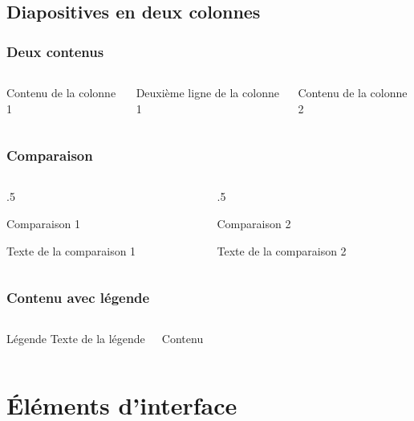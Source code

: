 \documentclass[aspectratio=1610,compress,t,english,french]{beamer}
\newenvironment{HECcomparaison}[1]{%
	\begin{column}[t]{.5\textwidth}
		\vspace{-7mm}		
		\begin{block}{#1}
}{%
		\end{block}
	\end{column}
}
\begin{document}
\subsection{Diapositives en deux colonnes}

\begin{frame}
	\frametitle{Deux contenus}
	\begin{columns}
			Contenu de la colonne 1
			
			Deuxième ligne de la colonne 1
			
			Contenu de la colonne 2
	\end{columns}
\end{frame}

\begin{frame}
\frametitle{Comparaison}
\begin{columns}
	\begin{HECcomparaison}{Comparaison 1}
		Texte de la comparaison 1
	\end{HECcomparaison}

	\begin{HECcomparaison}{Comparaison 2}
		Texte de la comparaison 2
	\end{HECcomparaison}
\end{columns}
\end{frame}

\begin{frame}
\frametitle{Contenu avec légende}
\begin{columns}
		\vspace{-7mm}
		\begin{block}{Légende}
			Texte de la légende
		\end{block}
		\vspace{-7mm}
			Contenu	
\end{columns}
\end{frame}

\section{Éléments d'interface}
\hypertarget{elementsInterface}{}
\end{document}
